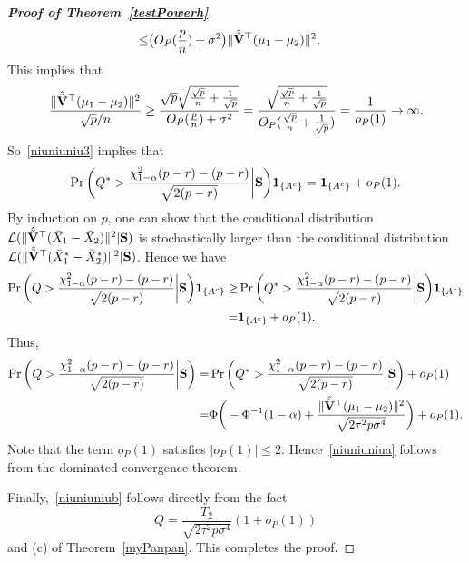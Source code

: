 \documentclass[times,sort&compress,3p]{elsarticle}
\theoremstyle{plain}
\theoremstyle{definition}
\theoremstyle{remark}
\begin{document}
\begin{appendices}
\begin{proof}[\textbf{Proof of Theorem~\ref{testPowerh}}]
$$\begin{aligned}
            \leq &
           \big(O_P(\frac{p}{n})+\sigma^2\big) \|\hat{\tilde{\mathbf{V}}}^\top (\mu_1-\mu_2)\|^2.
    \end{aligned}
$$
This implies that
$$
           \frac{\|\hat{\tilde{\mathbf{V}}}^\top (\mu_1-\mu_2)\|^2}{\sqrt{p}/n}\geq 
           \frac{
            \sqrt{p}\sqrt{\frac{\sqrt{p}}{n}+\frac{1}{\sqrt{p}}}
           }{
           O_P(\frac{p}{n})+\sigma^2
           }
           =
           \frac{
           \sqrt{\frac{\sqrt{p}}{n}+\frac{1}{\sqrt{p}}}
           }{
               O_P(\frac{\sqrt{p}}{n}+\frac{1}{\sqrt{p}})
           }
           =\frac{1}{o_P(1)}\to \infty.
$$
So~\eqref{niuniuniu3} implies that 
$$
    \begin{aligned}
        \Pr\bigg(Q^*>\frac{\chi^2_{1-\alpha}(p-r)-(p-r)}{\sqrt{2(p-r)}}\bigg|\mathbf{S}\bigg)\mathbf{1}_{\{A^c\}}= \mathbf{1}_{\{A^c\}}+o_P(1).
    \end{aligned}
$$
    By induction on $p$, one can show that the conditional distribution $\mathcal{L}(\|\hat{\tilde{\mathbf{V}}}^\top  (\bar{X}_1-\bar{X}_2)\|^2|\mathbf{S})$ is stochastically larger than the conditional distribution $\mathcal{L}(\|\hat{\tilde{\mathbf{V}}}^\top  (\bar{X}_1^*-\bar{X}_2^*)\|^2|\mathbf{S})$.
    Hence we have
    \begin{equation*}
    \begin{aligned}
        \Pr\bigg(Q>\frac{\chi^2_{1-\alpha}(p-r)-(p-r)}{\sqrt{2(p-r)}}\bigg|\mathbf{S}\bigg)\mathbf{1}_{\{A^c\}}
        \geq &
        \Pr\bigg(Q^*>\frac{\chi^2_{1-\alpha}(p-r)-(p-r)}{\sqrt{2(p-r)}}\bigg|\mathbf{S}\bigg)
\mathbf{1}_{\{A^c\}}
\\
        =&\mathbf{1}_{\{A^c\}}+o_P(1)
        .
    \end{aligned}
    \end{equation*}
    Thus,
$$
    \begin{aligned}
        \Pr\bigg(Q>\frac{\chi^2_{1-\alpha}(p-r)-(p-r)}{\sqrt{2(p-r)}}\bigg|\mathbf{S}\bigg)
        =&
        \Pr\bigg(Q^*>\frac{\chi^2_{1-\alpha}(p-r)-(p-r)}{\sqrt{2(p-r)}}\bigg|\mathbf{S}\bigg)+o_P(1)\\
        =&
        \Phi\bigg(-\Phi^{-1}(1-\alpha)+\frac{\|\hat{\tilde{\mathbf{V}}}^\top (\mu_1-\mu_2)\|^2}{\sqrt{2\tau^2 p\sigma^4}}\bigg)+o_P(1).
    \end{aligned}
$$
Note that the term $o_P(1)$ satisfies $|o_P(1)|\leq 2$. Hence~\eqref{niuniuniua} follows from the dominated convergence theorem.

Finally,~\eqref{niuniuniub} follows directly from the fact
$$
    Q=\frac{T_2}{\sqrt{2\tau^2 p\sigma^4}}(1+o_P(1))
$$
and (c) of Theorem~\ref{myPanpan}. This completes the proof.




\end{proof}




\end{appendices}
\end{document}
